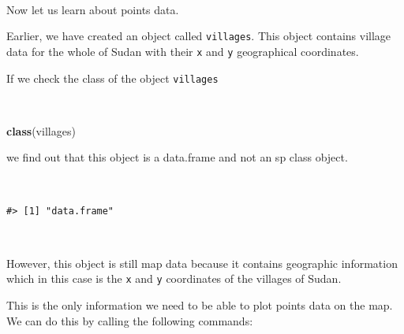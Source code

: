 \documentclass[12pt,a4paper,a4paper]{book}
\newenvironment{Shaded}{\begin{snugshade}}{\end{snugshade}}
\newcommand{\KeywordTok}[1]{\textcolor[rgb]{0.13,0.29,0.53}{\textbf{#1}}}
\newcommand{\DataTypeTok}[1]{\textcolor[rgb]{0.13,0.29,0.53}{#1}}
\newcommand{\DecValTok}[1]{\textcolor[rgb]{0.00,0.00,0.81}{#1}}
\newcommand{\FloatTok}[1]{\textcolor[rgb]{0.00,0.00,0.81}{#1}}
\newcommand{\StringTok}[1]{\textcolor[rgb]{0.31,0.60,0.02}{#1}}
\newcommand{\OtherTok}[1]{\textcolor[rgb]{0.56,0.35,0.01}{#1}}
\newcommand{\OperatorTok}[1]{\textcolor[rgb]{0.81,0.36,0.00}{\textbf{#1}}}
\newcommand{\NormalTok}[1]{#1}
\theoremstyle{definition}
\theoremstyle{definition}
\theoremstyle{definition}
\theoremstyle{remark}
\begin{document}
~

Now let us learn about points data.

Earlier, we have created an object called \texttt{villages}. This object
contains village data for the whole of Sudan with their \texttt{x} and
\texttt{y} geographical coordinates.

If we check the class of the object \texttt{villages}

~

\begin{Shaded}
\begin{Highlighting}[]
\KeywordTok{class}\NormalTok{(villages)}
\end{Highlighting}
\end{Shaded}

\newpage

we find out that this object is a data.frame and not an sp class object.

~

\begin{verbatim}
#> [1] "data.frame"
\end{verbatim}

~

However, this object is still map data because it contains geographic
information which in this case is the \texttt{x} and \texttt{y}
coordinates of the villages of Sudan.

This is the only information we need to be able to plot points data on
the map. We can do this by calling the following commands:

~

\begin{Shaded}
\end{Shaded}

\newpage
\end{document}
